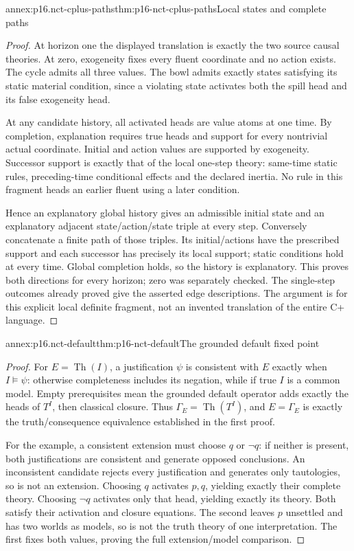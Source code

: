 \begin{annexitem}{annex:p16.nct-cplus-paths}{thm:p16-nct-cplus-paths}{Local states and complete paths}
\begin{proof}
At horizon one the displayed translation is exactly the two source causal
theories. At zero, exogeneity fixes every fluent coordinate and no action
exists. The cycle admits all three values. The bowl admits exactly states
satisfying its static material condition, since a violating state activates
both the spill head and its false exogeneity head.

At any candidate history, all activated heads are value atoms at one time.
By completion, explanation requires true heads and support for every
nontrivial actual coordinate.
Initial and action values are supported by exogeneity. Successor support
is exactly that of the local one-step theory: same-time static rules,
preceding-time conditional effects and the declared inertia.
No rule in this fragment heads an earlier fluent using a later condition.

Hence an explanatory global history gives an admissible initial state and
an explanatory adjacent state/action/state triple at every step.
Conversely concatenate a finite path of those triples. Its initial/actions
have the prescribed support and each successor has precisely its local
support; static conditions hold at every time. Global completion holds,
so the history is explanatory. This proves both directions for every
horizon; zero was separately checked. The single-step outcomes already
proved give the asserted edge descriptions.
The argument is for this explicit local definite fragment, not an invented
translation of the entire C+ language.
\end{proof}
\end{annexitem}

\begin{annexitem}{annex:p16.nct-default}{thm:p16-nct-default}{The grounded default fixed point}
\begin{proof}
For \(E=\operatorname{Th}(I)\), a justification \(\psi\) is consistent
with \(E\) exactly when \(I\models\psi\): otherwise completeness includes
its negation, while if true \(I\) is a common model.
Empty prerequisites mean the grounded default operator adds exactly
the heads of \(T^I\), then classical closure.
Thus \(\Gamma_E=\operatorname{Th}(T^I)\), and \(E=\Gamma_E\) is exactly
the truth/consequence equivalence established in the first proof.

For the example, a consistent extension must choose \(q\) or \(\neg q\):
if neither is present, both justifications are consistent and generate
opposed conclusions. An inconsistent candidate rejects every justification
and generates only tautologies, so is not an extension.
Choosing \(q\) activates \(p,q\), yielding exactly their complete theory.
Choosing \(\neg q\) activates only that head, yielding exactly its theory.
Both satisfy their activation and closure equations.
The second leaves \(p\) unsettled and has two worlds as models, so is
not the truth theory of one interpretation. The first fixes both values,
proving the full extension/model comparison.
\end{proof}
\end{annexitem}


